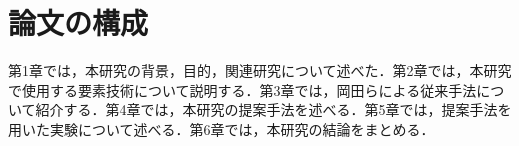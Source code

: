 
\section{論文の構成}

  第1章では，本研究の背景，目的，関連研究について述べた．第2章では，本研究で使用する要素技術について説明する．第3章では，岡田らによる従来手法について紹介する．第4章では，本研究の提案手法を述べる．第5章では，提案手法を用いた実験について述べる．第6章では，本研究の結論をまとめる．

\newpage
